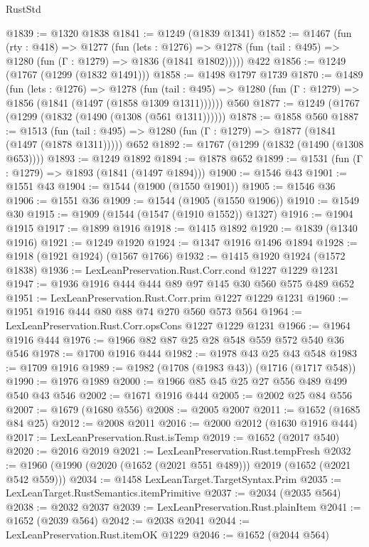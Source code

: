 \begin{lexlean}{RustStd}
\begin{coremodule}
{\begin{coremodule}
{{{{{{{{{{{@1839 := @1320 @1838
@1841 := @1249 (@1839 @1341)
@1852 := @1467
    (fun (rty : @418) =>
    @1277
      (fun (lets : @1276) =>
      @1278 (fun (tail : @495) => @1280 (fun (Γ : @1279) => @1836 (@1841 @1802)))))
    @422
@1856 := @1249 (@1767 (@1299 (@1832 @1491)))
@1858 := @1498 @1797 @1739
@1870 := @1489
    (fun (lets : @1276) =>
    @1278
      (fun (tail : @495) => @1280 (fun (Γ : @1279) => @1856 (@1841 (@1497 (@1858 @1309 @1311))))))
    @560
@1877 := @1249 (@1767 (@1299 (@1832 (@1490 (@1308 (@561 @1311))))))
@1878 := @1858 @560
@1887 := @1513
    (fun (tail : @495) => @1280 (fun (Γ : @1279) => @1877 (@1841 (@1497 (@1878 @1311)))))
    @652
@1892 := @1767 (@1299 (@1832 (@1490 (@1308 @653))))
@1893 := @1249 @1892
@1894 := @1878 @652
@1899 := @1531 (fun (Γ : @1279) => @1893 (@1841 (@1497 @1894)))
@1900 := @1546 @43
@1901 := @1551 @43
@1904 := @1544 (@1900 (@1550 @1901))
@1905 := @1546 @36
@1906 := @1551 @36
@1909 := @1544 (@1905 (@1550 @1906))
@1910 := @1549 @30
@1915 := @1909 (@1544 (@1547 (@1910 @1552)) @1327)
@1916 := @1904 @1915
@1917 := @1899 @1916
@1918 := @1415 @1892
@1920 := @1839 (@1340 @1916)
@1921 := @1249 @1920
@1924 := @1347 @1916 @1496 @1894
@1928 := @1918 (@1921 @1924) (@1567 @1766)
@1932 := @1415 @1920 @1924 (@1572 @1838)
@1936 := LexLeanPreservation.Rust.Corr.cond @1227 @1229 @1231
@1947 := @1936 @1916 @444 @444 @89 @97 @145 @30 @560 @575 @489 @652
@1951 := LexLeanPreservation.Rust.Corr.prim @1227 @1229 @1231
@1960 := @1951 @1916 @444 @80 @88 @74 @270 @560 @573 @564
@1964 := LexLeanPreservation.Rust.Corr.opsCons @1227 @1229 @1231
@1966 := @1964 @1916 @444
@1976 := @1966 @82 @87 @25 @28 @548 @559 @572 @540 @36 @546
@1978 := @1700 @1916 @444
@1982 := @1978 @43 @25 @43 @548
@1983 := @1709 @1916
@1989 := @1982 (@1708 (@1983 @43)) (@1716 (@1717 @548))
@1990 := @1976 @1989
@2000 := @1966 @85 @45 @25 @27 @556 @489 @499 @540 @43 @546
@2002 := @1671 @1916 @444
@2005 := @2002 @25 @84 @556
@2007 := @1679 (@1680 @556)
@2008 := @2005 @2007
@2011 := @1652 (@1685 @84 @25)
@2012 := @2008 @2011
@2016 := @2000 @2012 (@1630 @1916 @444)
@2017 := LexLeanPreservation.Rust.isTemp
@2019 := @1652 (@2017 @540)
@2020 := @2016 @2019
@2021 := LexLeanPreservation.Rust.tempFresh
@2032 := @1960 (@1990 (@2020 (@1652 (@2021 @551 @489))) @2019 (@1652 (@2021 @542 @559)))
@2034 := @1458 LexLeanTarget.TargetSyntax.Prim
@2035 := LexLeanTarget.RustSemantics.itemPrimitive
@2037 := @2034 (@2035 @564)
@2038 := @2032 @2037
@2039 := LexLeanPreservation.Rust.plainItem
@2041 := @1652 (@2039 @564)
@2042 := @2038 @2041
@2044 := LexLeanPreservation.Rust.itemOK @1229
@2046 := @1652 (@2044 @564)
}}}}}}}}}}}
\end{coremodule}}
\end{coremodule}
\end{lexlean}
